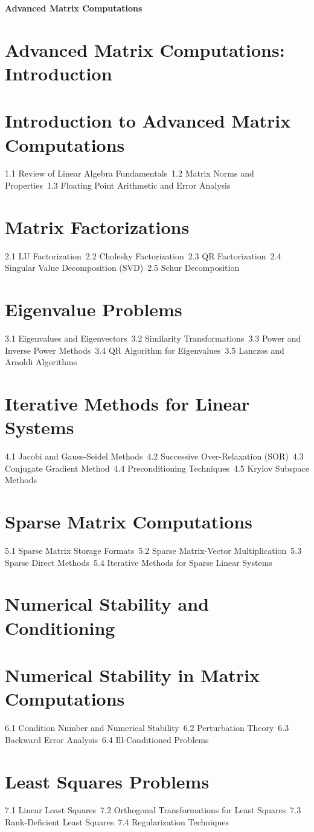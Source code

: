 {\LARGE \bf{Advanced Matrix Computations}}
\section{Advanced Matrix Computations: Introduction}
\section{Introduction to Advanced Matrix Computations}
1.1 Review of Linear Algebra Fundamentals\
1.2 Matrix Norms and Properties\
1.3 Floating Point Arithmetic and Error Analysis\
\section{Matrix Factorizations}
2.1 LU Factorization\
2.2 Cholesky Factorization\
2.3 QR Factorization\
2.4 Singular Value Decomposition (SVD)\
2.5 Schur Decomposition\
\section{Eigenvalue Problems}
3.1 Eigenvalues and Eigenvectors\
3.2 Similarity Transformations\
3.3 Power and Inverse Power Methods\
3.4 QR Algorithm for Eigenvalues\
3.5 Lanczos and Arnoldi Algorithms\
\section{Iterative Methods for Linear Systems}
4.1 Jacobi and Gauss-Seidel Methods\
4.2 Successive Over-Relaxation (SOR)\
4.3 Conjugate Gradient Method\
4.4 Preconditioning Techniques\
4.5 Krylov Subspace Methods\
\section{Sparse Matrix Computations}
5.1 Sparse Matrix Storage Formats\
5.2 Sparse Matrix-Vector Multiplication\
5.3 Sparse Direct Methods\
5.4 Iterative Methods for Sparse Linear Systems\
\section{Numerical Stability and Conditioning}
\section{Numerical Stability in Matrix Computations}
6.1 Condition Number and Numerical Stability\
6.2 Perturbation Theory\
6.3 Backward Error Analysis\
6.4 Ill-Conditioned Problems\
\section{Least Squares Problems}
7.1 Linear Least Squares\
7.2 Orthogonal Transformations for Least Squares\
7.3 Rank-Deficient Least Squares\
7.4 Regularization Techniques\
